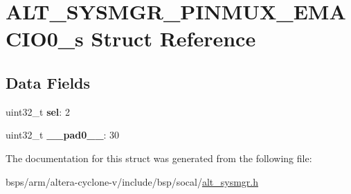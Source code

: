 \hypertarget{structALT__SYSMGR__PINMUX__EMACIO0__s}{}\section{A\+L\+T\+\_\+\+S\+Y\+S\+M\+G\+R\+\_\+\+P\+I\+N\+M\+U\+X\+\_\+\+E\+M\+A\+C\+I\+O0\+\_\+s Struct Reference}
\label{structALT__SYSMGR__PINMUX__EMACIO0__s}
\subsection*{Data Fields}
\begin{DoxyCompactItemize}
\item 
\mbox{\label{structALT__SYSMGR__PINMUX__EMACIO0__s_adda1aa2e3e7917639f68ca25ec12d3bf}} 
uint32\+\_\+t {\bfseries sel}\+: 2
\item 
\mbox{\label{structALT__SYSMGR__PINMUX__EMACIO0__s_a798b2cc24c2d9063e89c25a450765612}} 
uint32\+\_\+t {\bfseries \+\_\+\+\_\+pad0\+\_\+\+\_\+}\+: 30
\end{DoxyCompactItemize}


The documentation for this struct was generated from the following file\+:\begin{DoxyCompactItemize}
\item 
bsps/arm/altera-\/cyclone-\/v/include/bsp/socal/\mbox{\hyperlink{alt__sysmgr_8h}{alt\+\_\+sysmgr.\+h}}\end{DoxyCompactItemize}

